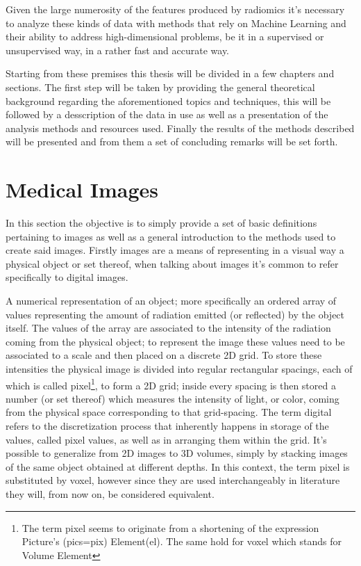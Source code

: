 Given the large numerosity of the features produced by radiomics it's necessary to analyze these kinds of data with methods that rely on Machine Learning and their ability to address high-dimensional problems, be it in a supervised or unsupervised way, in a rather fast and accurate way.

Starting from these premises this thesis will be divided in a few chapters and sections. The first step will be taken by providing the general theoretical background regarding the aforementioned topics and techniques, this will be followed by a desscription of the data in use as well as a presentation of the analysis methods and resources used. Finally the results of the methods described will be presented and from them a set of concluding remarks will be set forth.

\section{Medical Images}
In this section the objective is to simply provide a set of basic definitions pertaining to images as well as a general introduction to the methods used to create said images. Firstly images are a means of representing in a visual way a physical object or set thereof, when talking about images it's common to refer specifically to digital images.

\begin{definition}
A numerical representation of an object; more specifically an ordered array of values representing the amount of radiation emitted (or reflected) by the object itself. The values of the array are associated to the intensity of the radiation coming from the physical object; to represent the image these values need to be associated to a scale and then placed on a discrete 2D grid.
To store these intensities the physical image is divided into regular rectangular spacings, each of which is called pixel\footnote{The term pixel seems to originate from a shortening of the expression Picture's (pics=pix) Element(el). The same hold for voxel which stands for Volume Element}, to form a 2D grid; inside every spacing is then stored a number (or set thereof) which measures the intensity of light, or color, coming from the physical space corresponding to that grid-spacing.
The term digital refers to the discretization process that inherently happens in storage of the values, called pixel values, as well as in arranging them within the grid. It's possible to generalize from 2D images to 3D volumes, simply by stacking images of the same object obtained at different depths. In this context, the term pixel is substituted by voxel, however since they are used interchangeably in literature they will, from now on, be considered equivalent.
\end{definition}

